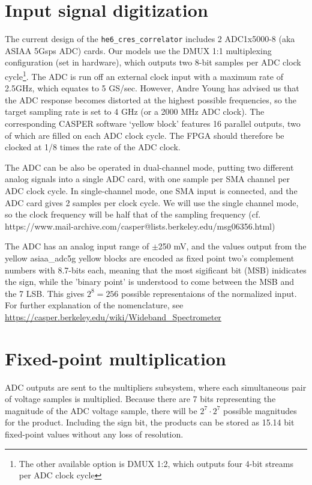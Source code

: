 \documentclass[a4paper,10pt]{article}
\begin{document}
\section{Input signal digitization}
The current design of the \texttt{he6\_cres\_correlator} includes 2 ADC1x5000-8 (aka ASIAA 5Gsps ADC) cards. Our models use the DMUX 1:1 multiplexing configuration (set in hardware), which outputs two 8-bit samples per ADC clock cycle\footnote{The other available option is DMUX 1:2, which outputs four 4-bit streams per ADC clock cycle}. The ADC is run off an external clock input with a maximum rate of 2.5GHz, which equates to 5 GS/sec. However, Andre Young has advised us that the ADC response becomes distorted at the highest possible frequencies, so the target sampling rate is set to 4 GHz (or a 2000 MHz ADC clock). The corresponding CASPER software `yellow block' features 16 parallel outputs, two of which are filled on each ADC clock cycle. The FPGA should therefore be clocked at 1/8 times the rate of the ADC clock.

The ADC can be also be operated in dual-channel mode, putting two different analog signals into a single ADC card, with one sample per SMA channel per ADC clock cycle. In single-channel mode, one SMA input is connected, and the ADC card gives 2 samples per clock cycle. We will use the single channel mode, so the clock frequency will be half that of the sampling frequency (cf. https://www.mail-archive.com/casper@lists.berkeley.edu/msg06356.html) 

The ADC has an analog input range of $\pm$250 mV, and the values output from the yellow asiaa\_adc5g yellow blocks are encoded as fixed point two's complement numbers with 8.7-bits each, meaning that the most sigificant bit (MSB) inidicates the sign, while the 'binary point' is understood to come between the MSB and the 7 LSB. This gives $2^8=256$ possible representaions of the normalized input. For further explanation of the nomenclature, see \href{https://casper.berkeley.edu/wiki/Wideband\_Spectrometer}{https://casper.berkeley.edu/wiki/Wideband\_Spectrometer}

\section{Fixed-point multiplication}
ADC outputs are sent to the multipliers subsystem, where each simultaneous pair of voltage samples is multiplied. Because there are 7 bits representing the magnitude of the ADC voltage sample, there will be $2^7 \cdot 2^7$ possible magnitudes for the product. Including the sign bit, the products can be stored as 15.14 bit fixed-point values without any loss of resolution. 
\end{document}
